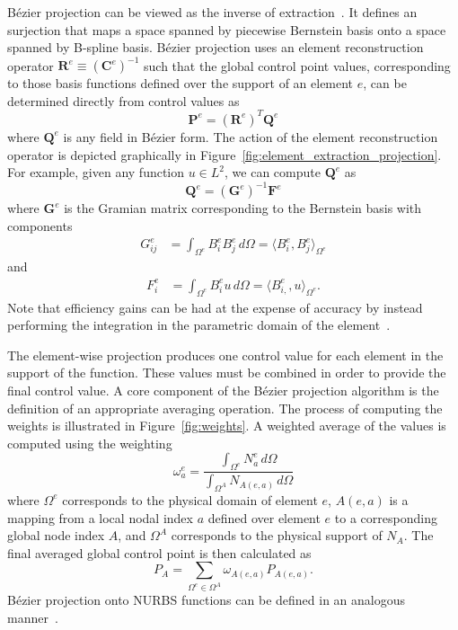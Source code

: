 B\'{e}zier projection can be viewed as the inverse of extraction~\cite{thomas_bezier_2015}. It defines an surjection that maps a space spanned by  piecewise Bernstein basis onto a space spanned by B-spline basis. B\'ezier projection uses an element reconstruction operator $\mathbf{R}^e\equiv(\mathbf{C}^e)^{-1}$ such that the global control point values, corresponding to those basis functions defined over the support of an element $e$, can be determined directly from \Bezier control values as
\begin{equation}
    \mathbf{P}^e=(\mathbf{R}^e)^T\mathbf{Q}^e
\end{equation}
where $\mathbf{Q}^e$ is any field in B\'ezier form. The action of the element reconstruction operator is depicted graphically in Figure~\ref{fig:element_extraction_projection}. For example, given any function $u \in L^2$, we can compute $\mathbf{Q}^e$ as
\begin{equation}
    \mathbf{Q}^e=(\mathbf{G}^e)^{-1}\mathbf{F}^e
    \label{eq:element-Qi}
\end{equation}
where $\mathbf{G}^e$ is the Gramian matrix corresponding to the Bernstein basis with components
\begin{align}
    {G}_{ij}^e & = \int_{\Omega^e} B^e_i B^e_j \, d\Omega =\langle{B^e_{i},B^e_{j}}\rangle_{\Omega^e}\label{eq:element_gramian}
\end{align}
and
\begin{align}
    {F}^e_i & =  \int_{\Omega^e} B^e_i u \, d\Omega = \langle{B^e_{i,},u}\rangle_{\Omega^e}.
\end{align}
Note that efficiency gains can be had at the expense of accuracy by instead performing the integration in the parametric domain of the element~\cite{thomas_bezier_2015}.

The element-wise projection produces one control value for each element in the support of the function.  These values must be combined in order to provide the final control value.  A core component of the B\'ezier projection algorithm is the definition of an appropriate averaging operation. The process of computing the weights is illustrated in Figure~\ref{fig:weights}. A weighted average of the values is computed using the weighting
\begin{equation}\label{eq:Bezier_weight}
    \omega_a^e=\dfrac{\int_{\Omega^e} N_{a}^e \, d\Omega}{\int_{\Omega^A} N_{A(e,a)} \, d\Omega}
\end{equation}
where $\Omega^e$ corresponds to the physical domain of element $e$, $A(e,a)$ is a mapping from a local nodal index $a$ defined over element $e$ to a corresponding global node index $A$, and $\Omega^A$ corresponds to the physical support of $N_A$. The final averaged global control point is then calculated as
\begin{equation}
    P_A=\sum_{\Omega^e\in \Omega^A } \omega_{A(e,a)} P_{A(e,a)}.
\end{equation}
B\'ezier projection onto NURBS functions can be defined in an analogous manner~\cite{thomas_bezier_2015}.

